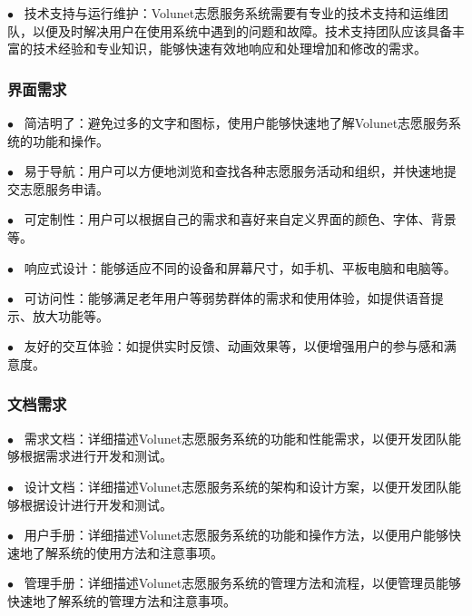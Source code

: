  
 $\bullet   \enspace$ 技术支持与运行维护：Volunet志愿服务系统需要有专业的技术支持和运维团队，以便及时解决用户在使用系统中遇到的问题和故障。技术支持团队应该具备丰富的技术经验和专业知识，能够快速有效地响应和处理增加和修改的需求。
 \hfill  
 
\subsubsection{界面需求}
 $\bullet   \enspace$ 简洁明了：避免过多的文字和图标，使用户能够快速地了解Volunet志愿服务系统的功能和操作。
 \hfill 
 
 $\bullet   \enspace$ 易于导航：用户可以方便地浏览和查找各种志愿服务活动和组织，并快速地提交志愿服务申请。
 \hfill 
 
 $\bullet   \enspace$ 可定制性：用户可以根据自己的需求和喜好来自定义界面的颜色、字体、背景等。
 \hfill 
 
 $\bullet   \enspace$ 响应式设计：能够适应不同的设备和屏幕尺寸，如手机、平板电脑和电脑等。
 \hfill 
 
 $\bullet   \enspace$ 可访问性：能够满足老年用户等弱势群体的需求和使用体验，如提供语音提示、放大功能等。
 \hfill 
 
 $\bullet   \enspace$ 友好的交互体验：如提供实时反馈、动画效果等，以便增强用户的参与感和满意度。
 \hfill 
 
 
\subsubsection{文档需求}
 $\bullet   \enspace$ 需求文档：详细描述Volunet志愿服务系统的功能和性能需求，以便开发团队能够根据需求进行开发和测试。
 \hfill 
 
 $\bullet   \enspace$ 设计文档：详细描述Volunet志愿服务系统的架构和设计方案，以便开发团队能够根据设计进行开发和测试。
 \hfill 
 
 $\bullet   \enspace$ 用户手册：详细描述Volunet志愿服务系统的功能和操作方法，以便用户能够快速地了解系统的使用方法和注意事项。
 \hfill 
 
 $\bullet   \enspace$ 管理手册：详细描述Volunet志愿服务系统的管理方法和流程，以便管理员能够快速地了解系统的管理方法和注意事项。
 \hfill 
 
